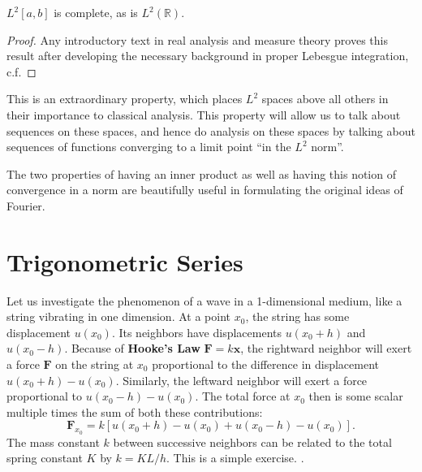 \documentclass[../master.tex]{subfiles}
\begin{document}
	
	\begin{theorem}
		$L^2[a,b]$ is complete, as is $L^2(\mathbb R)$.
	\end{theorem}
	\begin{proof}
		Any introductory text in real analysis and measure theory proves this result after developing the necessary background in proper Lebesgue integration, c.f. 
	\end{proof}
	

	This is an extraordinary property, which places $L^2$ spaces above all others in their importance to classical analysis. This property will allow us to talk about sequences on these spaces, and hence do analysis on these spaces by talking about sequences of functions converging to a limit point ``in the $L^2$ norm''. 
	
	The two properties of having an inner product as well as having this notion of convergence in a norm are beautifully useful in formulating the original ideas of Fourier. 

\section{Trigonometric Series} %
\label{sec:trigonometric_series}

	Let us investigate the phenomenon of a wave in a 1-dimensional medium, like a string vibrating in one dimension. At a point $x_0$, the string has some displacement $u(x_0)$. Its neighbors have displacements $u(x_0 + h)$ and $u(x_0 - h)$. 
	Because of \textbf{Hooke's Law} $\mathbf F = k \mathbf x$, the rightward neighbor will exert a force $\mathbf F$ on the string at $x_0$ proportional to the difference in displacement $u(x_0 + h) - u(x_0)$. Similarly, the leftward neighbor will exert a force proportional to $u(x_0 - h) - u(x_0)$. The total force at $x_0$ then is some scalar multiple times the sum of both these contributions:
	\begin{equation}
		\mathbf F_{x_0} = k [u(x_0 + h) - u(x_0) + u(x_0 - h) - u(x_0)].
	\end{equation}
	The mass constant $k$ between successive neighbors can be related to the total spring constant $K$ by $k = K L / h$. This is a simple exercise. . 
	
\end{document}
